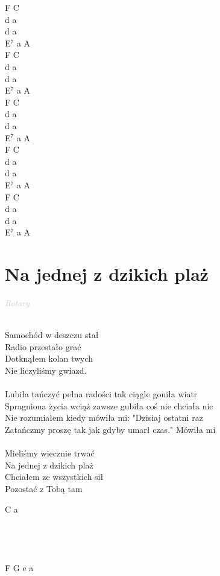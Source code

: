 \documentclass[a5paper, 10pt]{book}
\begin{document}
\begin{minipage}[t]{0.3\textwidth}
F C\\
d a\\
d a\\
E$^7$ a A\\

F C\\
d a\\
d a\\
E$^7$ a A\\

F C\\
d a\\
d a\\
E$^7$ a A\\

F C\\
d a\\
d a\\
E$^7$ a A\\

F C\\
d a\\
d a\\
E$^7$ a A\\
\end{minipage}

\section{Na jednej z dzikich plaż}\textcolor{lightgray}{\textit{Rotary}}\\~\\
\begin{minipage}[t]{0.8\textwidth}
Samochód w deszczu stał\\
Radio przestało grać\\
Dotknąłem kolan twych\\
Nie liczyliśmy gwiazd.\\
\\
\hspace*{5mm}Lubiła tańczyć pełna radości tak ciągle goniła wiatr\\
\hspace*{5mm}Spragniona życia wciąż zawsze gubiła coś nie chciała nic\\
\hspace*{5mm}Nie rozumiałem kiedy mówiła mi: "Dzisiaj ostatni raz\\
\hspace*{5mm}Zatańczmy proszę tak jak gdyby umarł czas." Mówiła mi\\
\\
Mieliśmy wiecznie trwać\\
Na jednej z dzikich plaż\\
Chciałem ze wszystkich sił\\
Pozostać z Tobą tam\\
\end{minipage}
\begin{minipage}[t]{0.2\textwidth}
C a\\
~\\
~\\
~\\
~\\
F G e a\\
\end{minipage}
\end{document}
